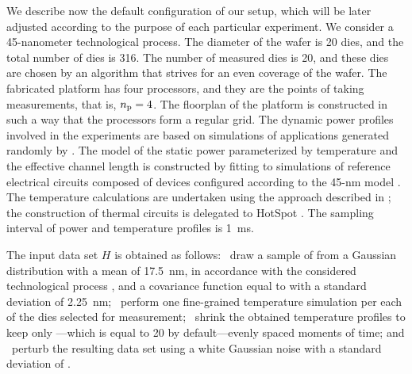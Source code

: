We describe now the default configuration of our setup, which will be later
adjusted according to the purpose of each particular experiment. We consider a
45-nanometer technological process. The diameter of the wafer is 20 dies, and
the total number of dies \nd is 316. The number of measured dies \ndm is 20, and
these dies are chosen by an algorithm that strives for an even coverage of the
wafer. The fabricated platform has four processors, and they are the points of
taking measurements, that is, ${n_\mathrm{p}} = 4$. The floorplan of the platform is
constructed in such a way that the processors form a regular grid. The dynamic
power profiles involved in the experiments are based on simulations of
applications generated randomly by  \cite{dick1998}. The model of the
static power parameterized by temperature and the effective channel length is
constructed by fitting to  simulations of reference electrical
circuits composed of  devices \cite{bsim} configured according to the
45-nm   model \cite{ptm}. The temperature calculations are
undertaken using the approach described in ; the
construction of thermal  circuits is delegated to HotSpot
\cite{skadron2003}. The sampling interval of power and temperature profiles is
1~ms.

The input data set $H$ is obtained as follows: \one~draw a sample of \g from a
Gaussian distribution with a mean of 17.5~nm, in accordance with the considered
technological process \cite{ptm}, and a covariance function equal to
 with a standard deviation of 2.25~nm; \two~perform
one fine-grained temperature simulation per each of the \ndm dies selected for
measurement; \three~shrink the obtained temperature profiles to keep only
\ns---which is equal to 20 by default---evenly spaced moments of time; and
\four~perturb the resulting data set using a white Gaussian noise with a
standard deviation of .

